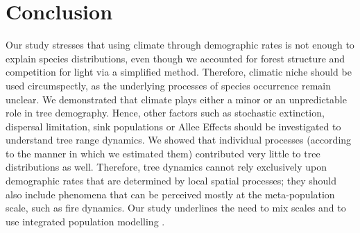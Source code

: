 \section{Conclusion}
Our study stresses that using climate through demographic rates is not enough to explain species distributions, even though we accounted for forest structure and competition for light via a simplified method. Therefore, climatic niche should be used circumspectly, as the underlying processes of species occurrence remain unclear. We demonstrated that climate plays either a minor or an unpredictable role in tree demography. Hence, other factors such as stochastic extinction, dispersal limitation, sink populations or Allee Effects \citep[and references therein]{Holt2005} should be investigated to understand tree range dynamics. We showed that individual processes (according to the manner in which we estimated them) contributed very little to tree distributions as well. Therefore, tree dynamics cannot rely exclusively upon demographic rates that are determined by local spatial processes; they should also include phenomena that can be perceived mostly at the meta-population scale, such as fire dynamics. Our study underlines the need to mix scales and to use integrated population modelling \citep{Isaac2020}.
